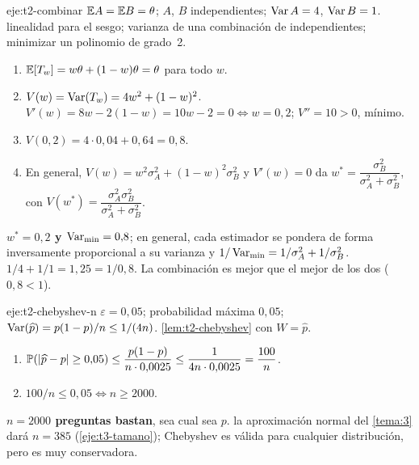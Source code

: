 \begin{solucion}{eje:t2-combinar}
\datos $\mathbb{E} A=\mathbb{E} B=\theta$; $A$, $B$ independientes; $\operatorname{Var} A=4$, $\operatorname{Var} B=1$.
\planteamiento linealidad para el sesgo; varianza de una combinación de independientes; minimizar un polinomio de grado~2.
\pasos
\begin{enumerate}[label=\arabic*.]
  \item $\mathbb{E}[T_w]=w\theta+(1-w)\theta=\theta$ para todo $w$.
  \item $V(w)=\operatorname{Var}(T_w)=4w^{2}+(1-w)^{2}$. $V'(w)=8w-2(1-w)=10w-2=0\iff w=0{,}2$; $V''=10>0$, mínimo.
  \item $V(0{,}2)=4\cdot0{,}04+0{,}64=0{,}8$.
  \item En general, $V(w)=w^{2}\sigma_A^{2}+(1-w)^{2}\sigma_B^{2}$ y $V'(w)=0$ da $w^{*}=\dfrac{\sigma_B^{2}}{\sigma_A^{2}+\sigma_B^{2}}$, con $V(w^{*})=\dfrac{\sigma_A^{2}\sigma_B^{2}}{\sigma_A^{2}+\sigma_B^{2}}$.
\end{enumerate}
\resultado \textbf{$w^{*}=0{,}2$ y $\operatorname{Var}_{\min}=0{,}8$}; en general, cada estimador se pondera de forma inversamente proporcional a su varianza y $1/\operatorname{Var}_{\min}=1/\sigma_A^{2}+1/\sigma_B^{2}$.
\comprobacion $1/4+1/1=1{,}25=1/0{,}8$. La combinación es mejor que el mejor de los dos ($0{,}8<1$).
\end{solucion}

\begin{solucion}{eje:t2-chebyshev-n}
\datos $\varepsilon=0{,}05$; probabilidad máxima $0{,}05$; $\operatorname{Var}(\widehat p)=p(1-p)/n\le1/(4n)$.
\planteamiento \cref{lem:t2-chebyshev} con $W=\widehat p$.
\pasos
\begin{enumerate}[label=\arabic*.]
  \item $\mathbb{P}(\lvert\widehat p-p\rvert\ge0{,}05)\le\dfrac{p(1-p)}{n\cdot0{,}0025}\le\dfrac{1}{4n\cdot0{,}0025}=\dfrac{100}{n}$.
  \item $100/n\le0{,}05\iff n\ge2000$.
\end{enumerate}
\resultado \textbf{$n=2000$ preguntas bastan}, sea cual sea $p$.
\comprobacion la aproximación normal del \cref{tema:3} dará $n=385$ (\cref{eje:t3-tamano}); Chebyshev es válida para cualquier distribución, pero es muy conservadora.
\end{solucion}

